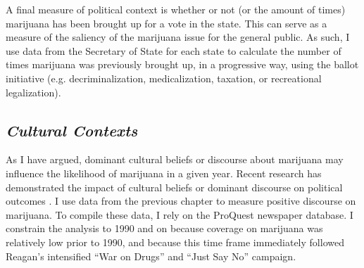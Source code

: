A final measure of political context is whether or not (or the amount of times) marijuana has been brought up for a vote in the state. This can serve as a measure of the saliency of the marijuana issue for the general public. As such, I use data from the Secretary of State for each state to calculate the number of times marijuana was previously brought up, in a progressive way, using the ballot initiative (e.g. decriminalization, medicalization, taxation, or recreational legalization). 



\subsection{\it{Cultural Contexts}}

As I have argued, dominant cultural beliefs or discourse about marijuana may influence the likelihood of marijuana in a given year.  Recent research has demonstrated the impact of cultural beliefs or dominant discourse on political outcomes \citep{bail_2012,mccammon_et_al_2007,ghaziani_and_baldassarri_2011}. I use data from the previous chapter to measure positive discourse on marijuana. To compile these data, I rely on the ProQuest newspaper database. I constrain the analysis to 1990 and on because coverage on marijuana was relatively low prior to 1990, and because this time frame immediately followed Reagan's intensified ``War on Drugs'' and ``Just Say No'' campaign. 

